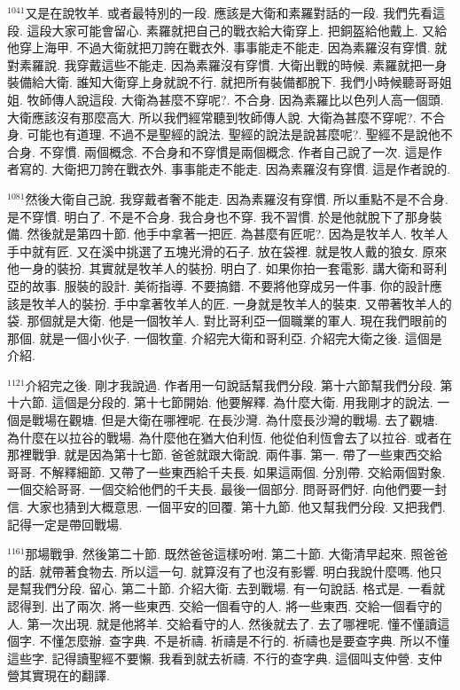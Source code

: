 \documentclass{book}
\begin{document}
$^{1041}$又是在說牧羊.
或者最特別的一段.
應該是大衛和素羅對話的一段.
我們先看這段.
這段大家可能會留心.
素羅就把自己的戰衣給大衛穿上.
把銅盔給他戴上.
又給他穿上海甲.
不過大衛就把刀誇在戰衣外.
事事能走不能走.
因為素羅沒有穿慣.
就對素羅說.
我穿戴這些不能走.
因為素羅沒有穿慣.
大衛出戰的時候.
素羅就把一身裝備給大衛.
誰知大衛穿上身就說不行.
就把所有裝備都脫下.
我們小時候聽哥哥姐姐.
牧師傳人說這段.
大衛為甚麼不穿呢?.
不合身.
因為素羅比以色列人高一個頭.
大衛應該沒有那麼高大.
所以我們經常聽到牧師傳人說.
大衛為甚麼不穿呢?.
不合身.
可能也有道理.
不過不是聖經的說法.
聖經的說法是說甚麼呢?.
聖經不是說他不合身.
不穿慣.
兩個概念.
不合身和不穿慣是兩個概念.
作者自己說了一次.
這是作者寫的.
大衛把刀誇在戰衣外.
事事能走不能走.
因為素羅沒有穿慣.
這是作者說的.

$^{1081}$然後大衛自己說.
我穿戴者奢不能走.
因為素羅沒有穿慣.
所以重點不是不合身.
是不穿慣.
明白了.
不是不合身.
我合身也不穿.
我不習慣.
於是他就脫下了那身裝備.
然後就是第四十節.
他手中拿著一把匠.
為甚麼有匠呢?.
因為是牧羊人.
牧羊人手中就有匠.
又在溪中挑選了五塊光滑的石子.
放在袋裡.
就是牧人戴的狼女.
原來他一身的裝扮.
其實就是牧羊人的裝扮.
明白了.
如果你拍一套電影.
講大衛和哥利亞的故事.
服裝的設計.
美術指導.
不要搞錯.
不要將他穿成另一件事.
你的設計應該是牧羊人的裝扮.
手中拿著牧羊人的匠.
一身就是牧羊人的裝束.
又帶著牧羊人的袋.
那個就是大衛.
他是一個牧羊人.
對比哥利亞一個職業的軍人.
現在我們眼前的那個.
就是一個小伙子.
一個牧童.
介紹完大衛和哥利亞.
介紹完大衛之後.
這個是介紹.

$^{1121}$介紹完之後.
剛才我說過.
作者用一句說話幫我們分段.
第十六節幫我們分段.
第十六節.
這個是分段的.
第十七節開始.
他要解釋.
為什麼大衛.
用我剛才的說法.
一個是戰場在觀塘.
但是大衛在哪裡呢.
在長沙灣.
為什麼長沙灣的戰場.
去了觀塘.
為什麼在以拉谷的戰場.
為什麼他在猶大伯利恆.
他從伯利恆會去了以拉谷.
或者在那裡戰爭.
就是因為第十七節.
爸爸就跟大衛說.
兩件事.
第一.
帶了一些東西交給哥哥.
不解釋細節.
又帶了一些東西給千夫長.
如果這兩個.
分別帶.
交給兩個對象.
一個交給哥哥.
一個交給他們的千夫長.
最後一個部分.
問哥哥們好.
向他們要一封信.
大家也猜到大概意思.
一個平安的回覆.
第十九節.
他又幫我們分段.
又把我們.
記得一定是帶回戰場.

$^{1161}$那場戰爭.
然後第二十節.
既然爸爸這樣吩咐.
第二十節.
大衛清早起來.
照爸爸的話.
就帶著食物去.
所以這一句.
就算沒有了也沒有影響.
明白我說什麼嗎.
他只是幫我們分段.
留心.
第二十節.
介紹大衛.
去到戰場.
有一句說話.
格式是.
一看就認得到.
出了兩次.
將一些東西.
交給一個看守的人.
將一些東西.
交給一個看守的人.
第一次出現.
就是他將羊.
交給看守的人.
然後就去了.
去了哪裡呢.
懂不懂讀這個字.
不懂怎麼辦.
查字典.
不是祈禱.
祈禱是不行的.
祈禱也是要查字典.
所以不懂這些字.
記得讀聖經不要懶.
我看到就去祈禱.
不行的查字典.
這個叫支仲營.
支仲營其實現在的翻譯.
\end{document}

